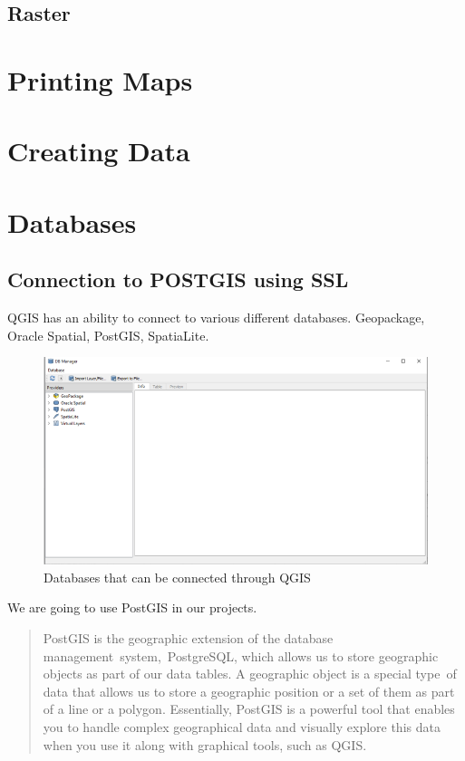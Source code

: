 \documentclass[
]{book}
\begin{document}
\hypertarget{raster}{%
\section{Raster}\label{raster}}

\hypertarget{printing-maps}{%
\chapter{Printing Maps}\label{printing-maps}}

\hypertarget{creating-data}{%
\chapter{Creating Data}\label{creating-data}}

\hypertarget{databases}{%
\chapter{Databases}\label{databases}}

\hypertarget{connection-to-postgis-using-ssl}{%
\section{Connection to POSTGIS using SSL}\label{connection-to-postgis-using-ssl}}

QGIS has an ability to connect to various different databases. Geopackage, Oracle Spatial, PostGIS, SpatiaLite.

\begin{figure}
\centering
\includegraphics{Images/databases.png}
\caption{Databases that can be connected through QGIS}
\end{figure}

We are going to use PostGIS in our projects.

\begin{quote}
PostGIS is the geographic extension of the database management~system,~PostgreSQL, which allows us to store geographic objects as part of our data tables. A geographic object is a special type~of data that allows us to store a geographic position or a set of them as part of a line or a polygon. Essentially, PostGIS is a powerful tool that enables you to handle complex geographical data and visually explore this data when you use it along with graphical tools, such as QGIS.
\end{quote}
\end{document}
